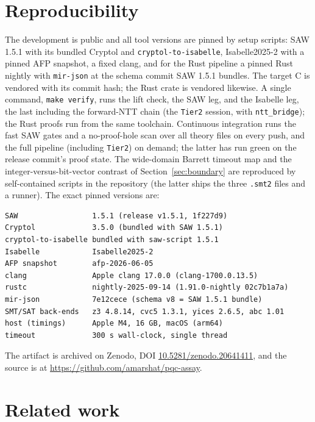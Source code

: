 \documentclass[11pt]{article}
\newcommand{\code}[1]{\texttt{#1}}
\begin{document}
\section{Reproducibility}\label{sec:repro}

The development is public and all tool versions are pinned by setup scripts: SAW 1.5.1 with its bundled
Cryptol and \code{cryptol-to-isabelle}, Isabelle2025-2 with a pinned AFP snapshot, a fixed clang, and for
the Rust pipeline a pinned Rust nightly with \code{mir-json} at the schema commit SAW 1.5.1 bundles. The
target C is vendored with its commit hash; the Rust crate is vendored likewise. A single command,
\code{make verify}, runs the lift check, the SAW leg, and the Isabelle leg, the last including the
forward-NTT chain (the \code{Tier2} session, with \code{ntt\_bridge}); the Rust proofs run from the same
toolchain. Continuous integration runs the fast SAW gates and a no-proof-hole scan over all theory files
on every push, and the full pipeline (including \code{Tier2}) on demand; the latter has run green on the
release commit's proof state. The wide-domain Barrett timeout map and the integer-versus-bit-vector contrast of
Section~\ref{sec:boundary} are reproduced by self-contained scripts in the repository (the latter ships
the three \code{.smt2} files and a runner). The exact pinned versions are:

\begin{lstlisting}
SAW                 1.5.1 (release v1.5.1, 1f227d9)
Cryptol             3.5.0 (bundled with SAW 1.5.1)
cryptol-to-isabelle bundled with saw-script 1.5.1
Isabelle            Isabelle2025-2
AFP snapshot        afp-2026-06-05
clang               Apple clang 17.0.0 (clang-1700.0.13.5)
rustc               nightly-2025-09-14 (1.91.0-nightly 02c7b1a7a)
mir-json            7e12cece (schema v8 = SAW 1.5.1 bundle)
SMT/SAT back-ends   z3 4.8.14, cvc5 1.3.1, yices 2.6.5, abc 1.01
host (timings)      Apple M4, 16 GB, macOS (arm64)
timeout             300 s wall-clock, single thread
\end{lstlisting}

\noindent The artifact is archived on Zenodo, DOI
\href{https://doi.org/10.5281/zenodo.20641411}{10.5281/zenodo.20641411}, and the source is at
\url{https://github.com/amarshat/pqc-assay}.

\section{Related work}\label{sec:related}
\end{document}
